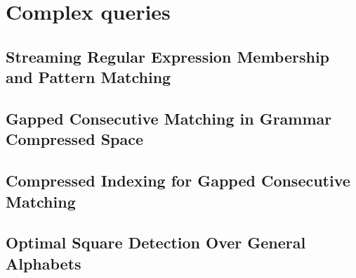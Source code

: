 \part{Complex queries}

\mainmatter
\chapter{Streaming Regular Expression Membership and Pattern Matching}


\mainmatter
\chapter{Gapped Consecutive Matching in Grammar Compressed Space}
\mainmatter
\chapter{Compressed Indexing for Gapped Consecutive Matching}

\mainmatter
\chapter{Optimal Square Detection Over General Alphabets}
